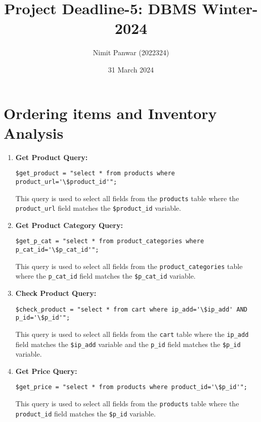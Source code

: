\documentclass{article}
\title{Project Deadline-5: DBMS Winter-2024} \author{Nimit Panwar (2022324)}
\date{31 March 2024}
\begin{document}
\maketitle

\vspace{3mm}

\section*{Ordering items and Inventory Analysis}

\vspace{3mm}

\begin{enumerate}
    \item \textbf{Get Product Query:}
    \begin{verbatim}
$get_product = "select * from products where product_url='\$product_id'";
    \end{verbatim}
    This query is used to select all fields from the \texttt{products} table where the \texttt{product\_url} field matches the \texttt{\$product\_id} variable.
    
    \item \textbf{Get Product Category Query:}
    \begin{verbatim}
$get_p_cat = "select * from product_categories where p_cat_id='\$p_cat_id'";
    \end{verbatim}
    This query is used to select all fields from the \texttt{product\_categories} table where the \texttt{p\_cat\_id} field matches the \texttt{\$p\_cat\_id} variable.
    
    \item \textbf{Check Product Query:}
    \begin{verbatim}
$check_product = "select * from cart where ip_add='\$ip_add' AND p_id='\$p_id'";
    \end{verbatim}
    This query is used to select all fields from the \texttt{cart} table where the \texttt{ip\_add} field matches the \texttt{\$ip\_add} variable and the \texttt{p\_id} field matches the \texttt{\$p\_id} variable.
    
    \item \textbf{Get Price Query:}
    \begin{verbatim}
$get_price = "select * from products where product_id='\$p_id'";
    \end{verbatim}
    This query is used to select all fields from the \texttt{products} table where the \texttt{product\_id} field matches the \texttt{\$p\_id} variable.
    

\end{enumerate}
\end{document}
